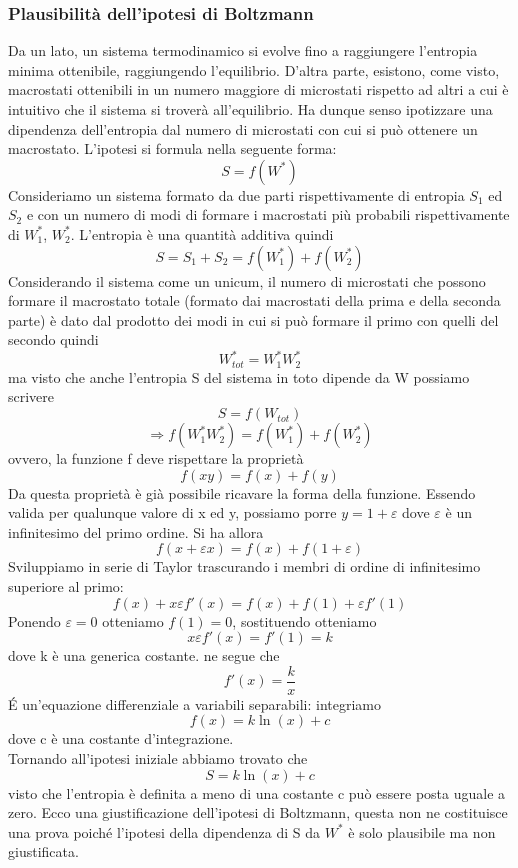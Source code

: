 \documentclass[10pt,a4paper]{article}
\begin{document}
\subsubsection*{Plausibilità dell'ipotesi di Boltzmann}
Da un lato, un sistema termodinamico si evolve fino a raggiungere l'entropia minima ottenibile, raggiungendo l'equilibrio. D'altra parte, esistono, come visto, macrostati ottenibili in un numero maggiore di microstati rispetto ad altri a cui è intuitivo che il sistema si troverà all'equilibrio. Ha dunque senso ipotizzare una dipendenza dell'entropia dal numero di microstati con cui si può ottenere un macrostato. L'ipotesi si formula nella seguente forma:
\[S = f(W^*)\]
Consideriamo un sistema formato da due parti rispettivamente di entropia \(S_1\) ed \(S_2\) e con un numero di modi di formare i macrostati più probabili rispettivamente di \(W_1^*\), \(W_2^*\). L'entropia è una quantità additiva quindi
\[S=S_1+S_2 = f(W_1^*)+f(W_2^*)\]
Considerando il sistema come un unicum, il numero di microstati che possono formare il macrostato totale (formato dai macrostati della prima e della seconda parte) è dato dal prodotto dei modi in cui si può formare il primo con quelli del secondo quindi
\[W_{tot}^*=W_1^*W_2^*\]
ma visto che anche l'entropia S del sistema in toto dipende da W possiamo scrivere
\[S=f(W_{tot})\]
\[\Rightarrow f(W_1^*W_2^*) = f(W_1^*)+f(W_2^*)\]
ovvero, la funzione f deve rispettare la proprietà
\[f(xy)=f(x)+f(y)\]
Da questa proprietà è già possibile ricavare la forma della funzione. Essendo valida per qualunque valore di x ed y, possiamo porre \(y=1+\varepsilon\) dove $\varepsilon$ è un infinitesimo del primo ordine. Si ha allora
\[f(x+\varepsilon x) = f(x)+f(1+\varepsilon)\]
Sviluppiamo in serie di Taylor trascurando i membri di ordine di infinitesimo superiore al primo:
\[f(x)+x\varepsilon f'(x)=f(x)+f(1)+\varepsilon f'(1)\]
Ponendo \(\varepsilon = 0\) otteniamo \(f(1)=0\), sostituendo otteniamo 
\[x\varepsilon f'(x) = f'(1)=k\]
dove k è una generica costante. ne segue che 
\[f'(x)=\frac{k}{x}\]
\'{E} un'equazione differenziale a variabili separabili: integriamo
\[f(x)=k\ln(x)+c\]
dove c è una costante d'integrazione.\\
Tornando all'ipotesi iniziale abbiamo trovato che 
\[S =k\ln(x)+c\]
visto che l'entropia è definita a meno di una costante c può essere posta uguale a zero. Ecco una giustificazione dell'ipotesi di Boltzmann, questa non ne costituisce una prova poiché l'ipotesi della dipendenza di S da \(W^*\) è solo plausibile ma non giustificata.\\\\
\end{document}
